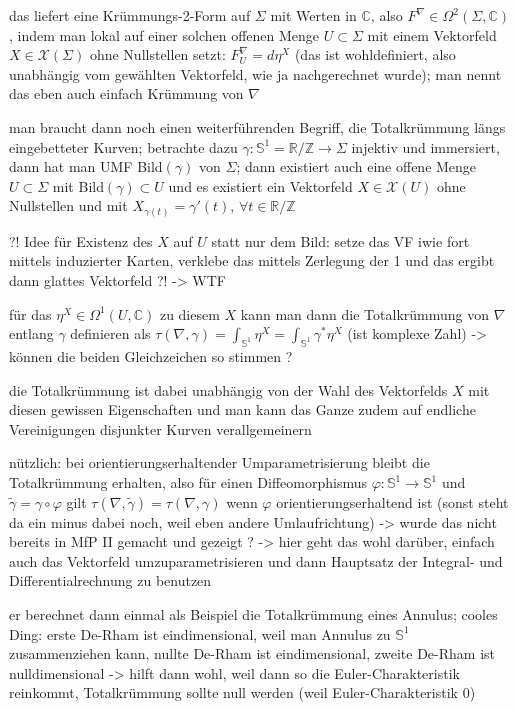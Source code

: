 \documentclass[../H_Analysis_main.tex]{subfiles}
\begin{document}
das liefert eine Krümmungs-2-Form auf $\Sigma$ mit Werten in $\mathbb{C}$, also $F^\nabla \in \Omega^2(\Sigma, \mathbb{C})$, indem man lokal auf einer solchen offenen Menge $U \subset \Sigma$ mit einem Vektorfeld $X \in \mathcal{X}(\Sigma)$ ohne Nullstellen setzt: $F^\nabla_U = d\eta^X$ (das ist wohldefiniert, also unabhängig vom gewählten Vektorfeld, wie ja nachgerechnet wurde); man nennt das eben auch einfach Krümmung von $\nabla$


man braucht dann noch einen weiterführenden Begriff, die Totalkrümmung längs eingebetteter Kurven; betrachte dazu $\gamma: \mathbb{S}^1 = \mathbb{R}/ \mathbb{Z} \rightarrow \Sigma$ injektiv und immersiert, dann hat man UMF Bild$(\gamma)$ von $\Sigma$; dann existiert auch eine offene Menge $U \subset \Sigma$ mit Bild$(\gamma) \subset U$ und es existiert ein Vektorfeld $X \in \mathcal{X}(U)$ ohne Nullstellen und mit $X_{\gamma(t)} = \gamma'(t), \, \forall t \in \mathbb{R}/ \mathbb{Z}$

?! Idee für Existenz des $X$ auf $U$ statt nur dem Bild: setze das VF iwie fort mittels induzierter Karten, verklebe das mittels Zerlegung der 1 und das ergibt dann glattes Vektorfeld ?! -> WTF

für das $\eta^X \in \Omega^1(U, \mathbb{C})$ zu diesem $X$ kann man dann die Totalkrümmung von $\nabla$ entlang $\gamma$ definieren als $\tau(\nabla, \gamma) = \int_{\mathbb{S}^1} \eta^X = \int_{\mathbb{S}^1} \gamma^*\eta^X$ (ist komplexe Zahl) -> können die beiden Gleichzeichen so stimmen ?

die Totalkrümmung ist dabei unabhängig von der Wahl des Vektorfelds $X$ mit diesen gewissen Eigenschaften und man kann das Ganze zudem auf endliche Vereinigungen disjunkter Kurven verallgemeinern

nützlich: bei orientierungserhaltender Umparametrisierung bleibt die Totalkrümmung erhalten, also für einen Diffeomorphismus $\varphi: \mathbb{S}^1 \rightarrow \mathbb{S}^1$ und $\tilde{\gamma} = \gamma \circ \varphi$ gilt $\tau(\nabla, \tilde{\gamma}) = \tau(\nabla, \gamma)$ wenn $\varphi$ orientierungserhaltend ist (sonst steht da ein minus dabei noch, weil eben andere Umlaufrichtung) -> wurde das nicht bereits in MfP II gemacht und gezeigt ? -> hier geht das wohl darüber, einfach auch das Vektorfeld umzuparametrisieren und dann Hauptsatz der Integral- und Differentialrechnung zu benutzen


er berechnet dann einmal als Beispiel die Totalkrümmung eines Annulus; cooles Ding: erste De-Rham ist eindimensional, weil man Annulus zu $\mathbb{S}^1$ zusammenziehen kann, nullte De-Rham ist eindimensional, zweite De-Rham ist nulldimensional -> hilft dann wohl, weil dann so die Euler-Charakteristik reinkommt, Totalkrümmung sollte null werden (weil Euler-Charakteristik 0)
\end{document}
